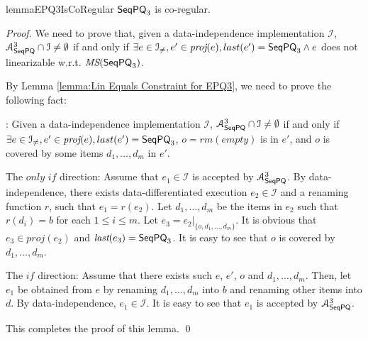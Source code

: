 \begin{restatable}{lemma}{EPQ3IsCoRegular}
\label{lemma:EPQ3 is co-regular}
$\mathsf{SeqPQ}_3$ is co-regular.
\end{restatable}

\begin {proof}

We need to prove that, given a data-independence implementation $\mathcal{I}$, $\mathcal{A}_{\mathsf{SeqPQ}}^3 \cap \mathcal{I} \neq \emptyset$ if and only if $\exists e \in \mathcal{I}_{\neq},e' \in \textit{proj}(e), last(e')=\mathsf{SeqPQ}_3 \wedge e$ does not linearizable w.r.t. $\textit{MS}(\mathsf{SeqPQ}_3)$.

By Lemma \ref{lemma:Lin Equals Constraint for EPQ3}, we need to prove the following fact:

: Given a data-independence implementation $\mathcal{I}$, $\mathcal{A}_{\mathsf{SeqPQ}}^3 \cap \mathcal{I} \neq \emptyset$ if and only if $\exists e \in \mathcal{I}_{\neq},e' \in \textit{proj}(e), last(e')=\mathsf{SeqPQ}_3$, $o = \textit{rm}(\textit{empty})$ is in $e'$, and $o$ is covered by some items $d_1,\ldots,d_m$ in $e'$.


\noindent The $\textit{only if}$ direction: Assume that $e_1 \in \mathcal{I}$ is accepted by $\mathcal{A}_{\mathsf{SeqPQ}}^3$. By data-independence, there exists data-differentiated execution $e_2 \in \mathcal{I}$ and a renaming function $r$, such that $e_1=r(e_2)$. Let $d_1,\ldots,d_m$ be the items in $e_2$ such that $r(d_i)=b$ for each $1 \leq i \leq m$. Let $e_3 = e_2 \vert_{ \{ o, d_1, \ldots, d_m \} }$. It is obvious that $e_3 \in \textit{proj}(e_2)$ and $\textit{last}(e_3) = \mathsf{SeqPQ}_3$. It is easy to see that $o$ is covered by $d_1,\ldots,d_m$.

\noindent The $\textit{if}$ direction: Assume that there exists such $e$, $e'$, $o$ and $d_1,\ldots,d_m$. Then, let $e_1$ be obtained from $e$ by renaming $d_1,\ldots,d_m$ into $b$ and renaming other items into $d$. By data-independence, $e_1 \in \mathcal{I}$. It is easy to see that $e_1$ is accepted by $\mathcal{A}_{\mathsf{SeqPQ}}^3$.

This completes the proof of this lemma. \qed
\end {proof}


